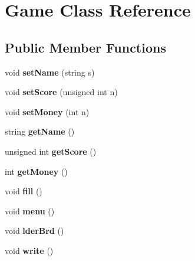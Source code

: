 \hypertarget{class_game}{}\section{Game Class Reference}
\label{class_game}
\subsection*{Public Member Functions}
\begin{DoxyCompactItemize}
\item 
\hypertarget{class_game_a7f9123c85fb54ed10929be10a3621254}{}\label{class_game_a7f9123c85fb54ed10929be10a3621254} 
void {\bfseries set\+Name} (string s)
\item 
\hypertarget{class_game_a5aeabc2fd25500f353bdab72c2a0de60}{}\label{class_game_a5aeabc2fd25500f353bdab72c2a0de60} 
void {\bfseries set\+Score} (unsigned int n)
\item 
\hypertarget{class_game_a4aeed869c24958824bdf8be937ca094f}{}\label{class_game_a4aeed869c24958824bdf8be937ca094f} 
void {\bfseries set\+Money} (int n)
\item 
\hypertarget{class_game_a5367d236c0f6d742b296847ab6eeefa0}{}\label{class_game_a5367d236c0f6d742b296847ab6eeefa0} 
string {\bfseries get\+Name} ()
\item 
\hypertarget{class_game_a72a1d876e0d3303c8911a0a7ea4f499f}{}\label{class_game_a72a1d876e0d3303c8911a0a7ea4f499f} 
unsigned int {\bfseries get\+Score} ()
\item 
\hypertarget{class_game_ae9b4f23f1e115d45f50703b01533678e}{}\label{class_game_ae9b4f23f1e115d45f50703b01533678e} 
int {\bfseries get\+Money} ()
\item 
\hypertarget{class_game_a49ded379e279ea868437560d8ac10fdb}{}\label{class_game_a49ded379e279ea868437560d8ac10fdb} 
void {\bfseries fill} ()
\item 
\hypertarget{class_game_a463932fa7ca2f1ce243279bf2422fc48}{}\label{class_game_a463932fa7ca2f1ce243279bf2422fc48} 
void {\bfseries menu} ()
\item 
\hypertarget{class_game_a01f5f6eebc3fe2d069c8e44227fb1b1e}{}\label{class_game_a01f5f6eebc3fe2d069c8e44227fb1b1e} 
void {\bfseries lder\+Brd} ()
\item 
\hypertarget{class_game_a75085a377fc907a1b988378434b01f19}{}\label{class_game_a75085a377fc907a1b988378434b01f19} 
void {\bfseries write} ()
\item 
\hypertarget{class_game_a109442fa16afc0dcb542d88a086aa5ed}{}\label{class_game_a109442fa16afc0dcb542d88a086aa5ed} 

\end{DoxyCompactItemize}
